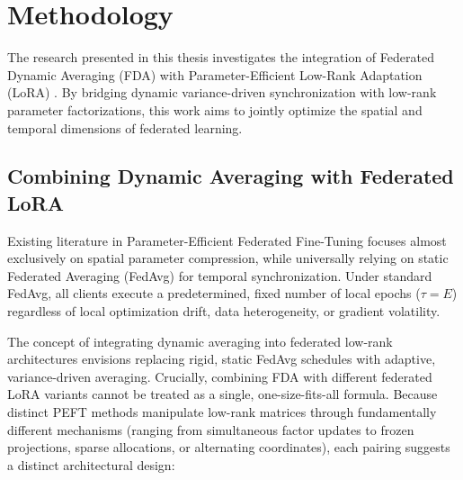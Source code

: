 \chapter{Methodology}
\label{chap:methodology}

The research presented in this thesis investigates the integration of Federated Dynamic Averaging (FDA) \cite{theologitis2025fda} with Parameter-Efficient Low-Rank Adaptation (LoRA) \cite{hu2022lora}. By bridging dynamic variance-driven synchronization with low-rank parameter factorizations, this work aims to jointly optimize the spatial and temporal dimensions of federated learning.

\section{Combining Dynamic Averaging with Federated LoRA}
\label{sec:fda_lora_taxonomy}
Existing literature in Parameter-Efficient Federated Fine-Tuning focuses almost exclusively on spatial parameter compression, while universally relying on static Federated Averaging (FedAvg) \cite{mcmahan2017communication} for temporal synchronization. Under standard FedAvg, all clients execute a predetermined, fixed number of local epochs ($\tau = E$) regardless of local optimization drift, data heterogeneity, or gradient volatility.

The concept of integrating dynamic averaging into federated low-rank architectures envisions replacing rigid, static FedAvg schedules with adaptive, variance-driven averaging. Crucially, combining FDA with different federated LoRA variants cannot be treated as a single, one-size-fits-all formula. Because distinct PEFT methods manipulate low-rank matrices through fundamentally different mechanisms (ranging from simultaneous factor updates to frozen projections, sparse allocations, or alternating coordinates), each pairing suggests a distinct architectural design:

